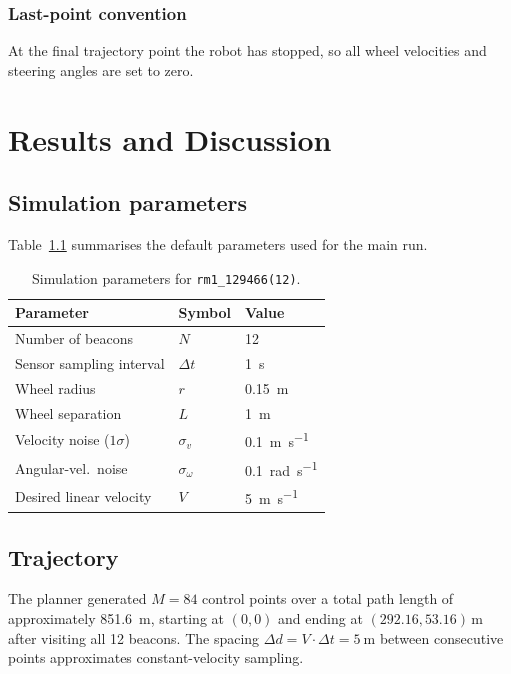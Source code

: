 \documentclass[a4paper,11pt]{report}
\begin{document}
\subsection{Last-point convention}

At the final trajectory point the robot has stopped, so all wheel velocities and steering angles are set to zero.

\chapter{Results and Discussion}
\label{chap:results}

\section{Simulation parameters}

Table~\ref{tab:params} summarises the default parameters used for the main run.

\begin{table}[H]
  \centering
  \caption{Simulation parameters for \texttt{rm1\_129466(12)}.}
  \label{tab:params}
  \begin{tabular}{lll}
    \toprule
    Parameter & Symbol & Value \\
    \midrule
    Number of beacons         & $N$        & 12 \\
    Sensor sampling interval  & $\Delta t$ & \SI{1}{\second} \\
    Wheel radius              & $r$        & \SI{0.15}{\metre} \\
    Wheel separation          & $L$        & \SI{1}{\metre} \\
    Velocity noise ($1\sigma$)& $\sigma_v$ & \SI{0.1}{\metre\per\second} \\
    Angular-vel.\ noise       & $\sigma_\omega$ & \SI{0.1}{\radian\per\second} \\
    Desired linear velocity   & $V$        & \SI{5}{\metre\per\second} \\
    \bottomrule
  \end{tabular}
\end{table}

\section{Trajectory}

The planner generated $M = 84$ control points over a total path length of approximately \SI{851.6}{\metre}, starting at $(0, 0)$ and ending at $(292.16, 53.16)$\,m after visiting all 12 beacons.  The spacing $\Delta d = V \cdot \Delta t = \SI{5}{\metre}$ between consecutive points approximates constant-velocity sampling.
\end{document}
